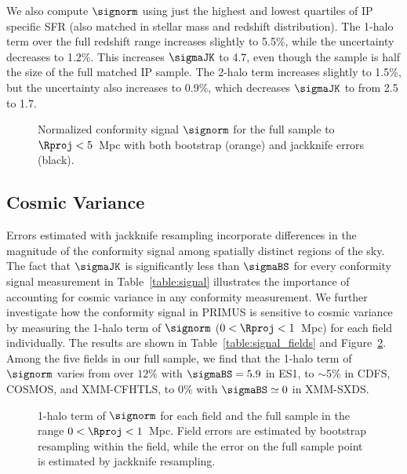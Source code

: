 We also compute $\signorm$ using just the highest and lowest quartiles of IP specific SFR (also matched in stellar mass and redshift distribution).
The 1-halo term over the full redshift range increases slightly to 5.5\%, while the uncertainty decreases to 1.2\%.
This increases $\sigmaJK$ to 4.7, even though the sample is half the size of the full matched IP sample.
The 2-halo term increases slightly to 1.5\%, but the uncertainty also increases to 0.9\%, which decreases $\sigmaJK$ to from 2.5 to 1.7.



\begin{figure}
  \epstrim{0.3in 0.1in 0.2in 0.3in}
  \caption{Normalized conformity signal $\signorm$ for the full sample to {$\Rproj<5$~Mpc} with both bootstrap (orange) and jackknife errors (black).
}
  \label{fig:normsig_full}
\end{figure}

\subsection{Cosmic Variance}\label{sec:cosmic_var}

Errors estimated with jackknife resampling incorporate differences in the magnitude of the conformity signal among spatially distinct regions of the sky.
The fact that $\sigmaJK$ is significantly less than $\sigmaBS$ for every conformity signal measurement in Table~\ref{table:signal}
illustrates the importance of accounting for cosmic variance in any conformity measurement.
We further investigate how the conformity signal in PRIMUS is sensitive to cosmic variance by measuring the 1-halo term of $\signorm$ {($0<\Rproj<1$~Mpc)} for each field individually.
The results are shown in Table~\ref{table:signal_fields} and Figure~\ref{fig:normsig_fields_1halo}.
Among the five fields in our full sample, we find that the 1-halo term of $\signorm$ varies from over $12\%$ with $\sigmaBS=5.9$ in ES1, to $\sim$5\% in CDFS, COSMOS, and XMM-CFHTLS, to $0\%$ with $\sigmaBS\simeq0$ in XMM-SXDS.

\begin{figure}
  \epstrim{0.4in 0.7in 0.3in 0.3in}
  \caption{
1-halo term of $\signorm$ for each field and the full sample in the range {$0<\Rproj<1$~Mpc}.
Field errors are estimated by bootstrap resampling within the field, while the error on the full sample point is estimated by jackknife resampling.
}
  \label{fig:normsig_fields_1halo}
\end{figure}

